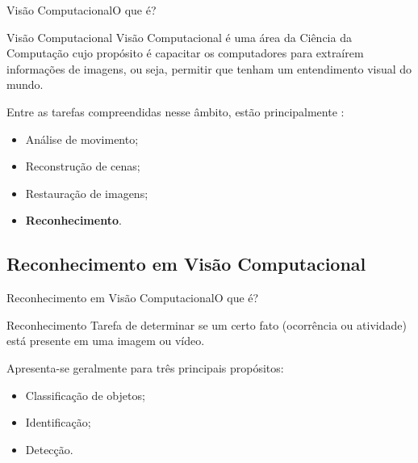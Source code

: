 \documentclass{beamer}
\begin{document}
\begin{frame}{Visão Computacional}{O que é?}

        \begin{block}{Visão Computacional}
        Visão Computacional é uma área da Ciência da Computação
        cujo propósito é capacitar os computadores para extraírem
        informações de imagens, ou seja, permitir que tenham
        um entendimento visual do mundo.
        \end{block}

        \pause

        \vspace{.3cm}
        
        Entre as tarefas compreendidas nesse âmbito, estão principalmente \cite{szeliski2011}:
        \begin{itemize}
            \item<3-> Análise de movimento;
            \item<4-> Reconstrução de cenas;
            \item<5-> Restauração de imagens;
            \item<6-> \textbf{Reconhecimento}.
        \end{itemize} 


    \end{frame}

\subsection{Reconhecimento em Visão Computacional}
    \begin{frame}{Reconhecimento em Visão Computacional}{O que é?}

        \begin{block}{Reconhecimento}
            Tarefa de determinar se um certo fato (ocorrência ou atividade) está presente em uma imagem ou vídeo. 
        \end{block}

        \pause

        Apresenta-se geralmente para três principais propósitos:

        \begin{itemize}
            \item<3-> Classificação de objetos;
            \item<4-> Identificação;
            \item<5-> Detecção.
        \end{itemize}

    \end{frame}
\end{document}
